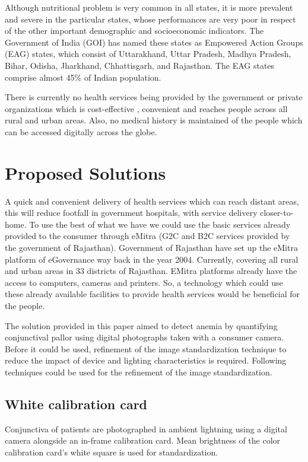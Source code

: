 \documentclass[peerreview]{IEEEtran}
\begin{document}
Although nutritional problem is very common in all states, it is more prevalent and severe in the particular states, whose 
performances are very poor in respect of the other important demographic and 
socioeconomic indicators. The Government of India (GOI) has named these states as Empowered Action Groups (EAG) states, 
which consist of Uttarakhand, Uttar Pradesh, Madhya Pradesh, Bihar, Odisha, Jharkhand, Chhattisgarh, and Rajasthan. The 
EAG states comprise almost 45\% of Indian population\cite{singh2014}.

There is currently no health services being provided by the government or private organizations which is cost-effective
, convenient and reaches people across all rural and urban areas. Also, no medical history is maintained of the people
which can be accessed digitally across the globe. 

\section{Proposed Solutions}
A quick and convenient delivery of health services which can reach distant areas, this will reduce footfall in  government 
hospitals, with service delivery closer-to-home. To use the best of what we have we could use the basic services already
provided to the consumer through eMitra (G2C and B2C services provided by the government of Rajasthan). Government of 
Rajasthan have set up the eMitra platform of eGovernance way back in the year 2004. Currently, covering all rural 
and urban areas in 33 districts of Rajasthan. EMitra platforms already have the access to computers, cameras and printers. 
So, a technology which could use these already available facilities to provide health services would be beneficial for the 
people. 

The solution provided in this paper aimed to detect anemia by quantifying conjunctival pallor using digital photographs 
taken with a consumer camera. Before it could be used, refinement of the image standardization technique to reduce the 
impact of device and lighting characteristics is required\cite{10.1371/journal.pone.0153286}. Following techniques 
could be used for the refinement of the image standardization.
\subsection{White calibration card}
Conjunctiva of patients are photographed in ambient lightning using a digital camera alongside an in-frame calibration
card. Mean brightness of the color calibration card's white square is used for standardization.
\end{document}
